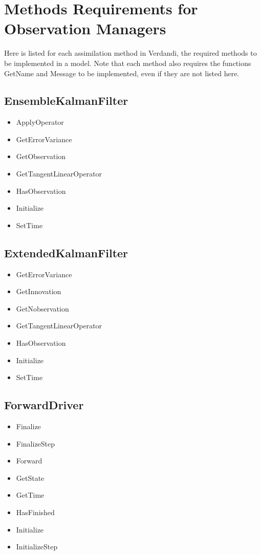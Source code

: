 \documentclass{tufte-book}
\begin{document}
\hypertarget{observation_requirement_page}{
\section{Methods Requirements for Observation Managers}
\label{observation_requirement_page}
}



Here is listed for each assimilation method in Verdandi, the required methods to be implemented in a model. Note that each method also requires the functions
GetName and Message to be implemented, even if they are not listed here.

\subsection{EnsembleKalmanFilter}

\begin{itemize}
\item ApplyOperator
\item GetErrorVariance
\item GetObservation
\item GetTangentLinearOperator
\item HasObservation
\item Initialize
\item SetTime
\end{itemize}



\subsection{ExtendedKalmanFilter}

\begin{itemize}
\item GetErrorVariance
\item GetInnovation
\item GetNobservation
\item GetTangentLinearOperator
\item HasObservation
\item Initialize
\item SetTime
\end{itemize}

\subsection{ForwardDriver}

\begin{itemize}
\item Finalize
\item FinalizeStep
\item Forward
\item GetState
\item GetTime
\item HasFinished
\item Initialize
\item InitializeStep
\end{itemize}
\end{document}
